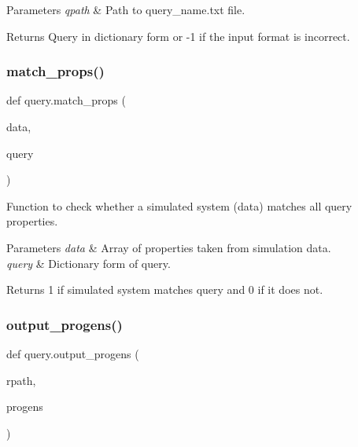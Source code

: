 \begin{DoxyParams}{Parameters}
{\em qpath} & Path to query\+\_\+name.\+txt file. \\
\hline
\end{DoxyParams}
\begin{DoxyReturn}{Returns}
Query in dictionary form or -\/1 if the input format is incorrect. 
\end{DoxyReturn}
\mbox{\label{namespacequery_a58d8e5311469ef07a2a1f81db99edc57}} 
\subsubsection{\texorpdfstring{match\+\_\+props()}{match\_props()}}
{\footnotesize\ttfamily def query.\+match\+\_\+props (\begin{DoxyParamCaption}\item[{}]{data,  }\item[{}]{query }\end{DoxyParamCaption})}



Function to check whether a simulated system (data) matches all query properties. 


\begin{DoxyParams}{Parameters}
{\em data} & Array of properties taken from simulation data. \\
\hline
{\em query} & Dictionary form of query. \\
\hline
\end{DoxyParams}
\begin{DoxyReturn}{Returns}
1 if simulated system matches query and 0 if it does not. 
\end{DoxyReturn}
\mbox{\label{namespacequery_abd70c38699dfe0661022a6c70496017b}} 
\subsubsection{\texorpdfstring{output\+\_\+progens()}{output\_progens()}}
{\footnotesize\ttfamily def query.\+output\+\_\+progens (\begin{DoxyParamCaption}\item[{}]{rpath,  }\item[{}]{progens }\end{DoxyParamCaption})}



